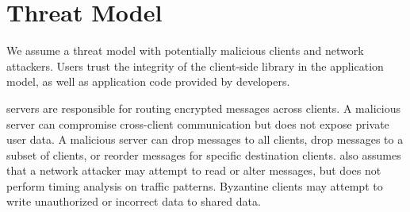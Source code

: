 \section{Threat Model}


We assume a threat model with  potentially malicious  clients and network attackers.  Users trust the integrity of  the client-side library in the application model, as well as application code provided by developers. 

\name{} servers are responsible for routing encrypted messages across clients. A malicious server can compromise cross-client communication but does not expose private user data. A malicious server can drop messages to all clients, drop messages to a subset of clients, or reorder messages for specific destination clients. 
\name{} also assumes that a network attacker may attempt to read or alter messages, but does not perform timing analysis on traffic patterns. Byzantine clients may attempt to write unauthorized or incorrect data to shared data.

